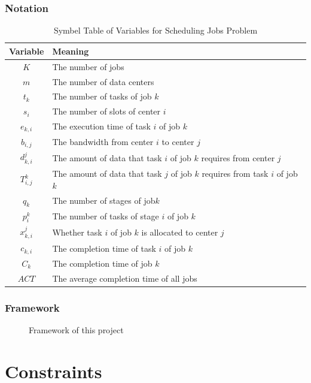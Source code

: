\begin{frame}
\frametitle{Notation}
\begin{table}[h]
    \centering\scriptsize
    \caption{Symbel Table of Variables for Scheduling Jobs Problem}\label{tab:variables}
    \begin{tabular}{c|l}
    \hline
         Variable & Meaning\\
    \hline
        $K$ & The number of jobs\\
        $m$ & The number of data centers\\
        $t_k$ & The number of tasks of job $k$\\
        $s_i$ & The number of slots of center $i$\\
        $e_{k,i}$ & The execution time of task $i$ of job $k$\\
        $b_{i,j}$ & The bandwidth from center $i$ to center $j$\\
        $d_{k,i}^j$ & The amount of data that task $i$ of job $k$ requires from center $j$\\
        $T_{i,j}^k$ & The amount of data that task $j$ of job $k$ requires from task $i$ of job $k$\\
        $q_k$ & The number of stages of job$k$\\
        $p_i^k$ & The number of tasks of stage $i$ of job $k$\\
        $x_{k,i}^j$ & Whether task $i$ of job $k$ is allocated to center $j$\\
        $c_{k,i}$ & The completion time of task $i$ of job $k$\\
        $C_k$ & The completion time of job $k$\\
        $ACT$ & The average completion time of all jobs\\
    \hline
    \end{tabular}
\end{table}
\end{frame}

\begin{frame}
    \frametitle{Framework}
    \begin{figure}
        \centering
        
        \caption{Framework of this project}
    \end{figure}
\end{frame}

\section{Constraints}

